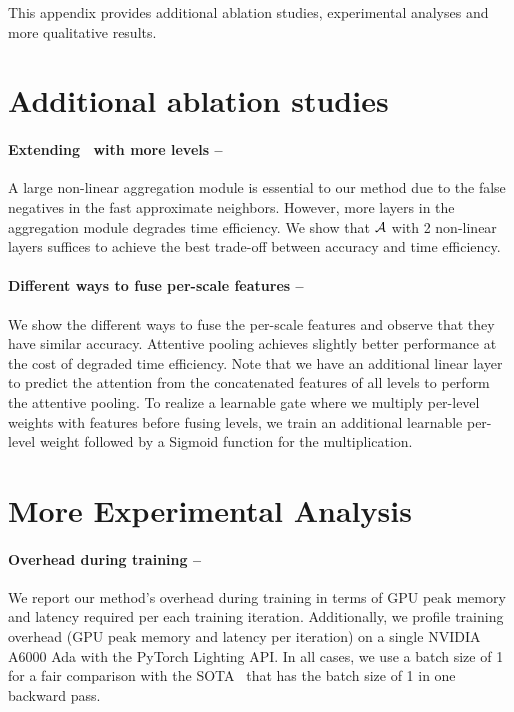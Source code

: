 \appendix
\clearpage
\setcounter{page}{1}
\maketitlesupplementary

This appendix provides additional ablation studies, experimental analyses and more qualitative results.
\section{Additional ablation studies}

\paragraph{Extending~ with more levels -- } 
A large non-linear aggregation module is essential to our method due to the false negatives in the fast approximate neighbors. However, more layers in the aggregation module degrades time efficiency. We show that $\mathcal{A}$ with 2 non-linear layers suffices to achieve the best trade-off between accuracy and time efficiency.


\paragraph{Different ways to fuse per-scale features -- } 
We show the different ways to fuse the per-scale features and observe that they have similar accuracy. Attentive pooling achieves slightly better performance at the cost of degraded time efficiency. 
Note that we have an additional linear layer to predict the attention from the  concatenated features of all levels to perform the attentive pooling.
To realize a learnable gate where we multiply per-level weights with features before fusing levels, we train an additional learnable per-level weight followed by a Sigmoid function for the multiplication.

\section{More Experimental Analysis}

\paragraph{Overhead during training -- } 
We report our method's overhead during training in terms of GPU peak memory and latency required per each training iteration.   
Additionally, we profile training overhead (GPU peak memory and latency per iteration) on a single NVIDIA A6000 Ada with the PyTorch Lighting API. In all cases, we use a batch size of 1 for a fair comparison with the SOTA~\cite{huang2023neural} that has the batch size of 1 in one backward pass.  

